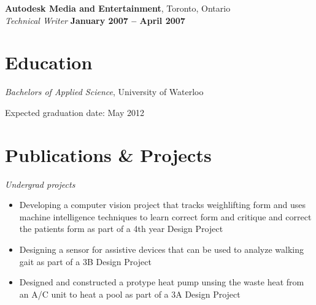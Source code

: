 \documentclass[margin,line]{resume}
\begin{document}
\begin{resume}
\begin{samepage}
    \textbf{Autodesk Media and Entertainment}, Toronto, Ontario \vspace{2mm}\\\vspace{1mm}%
    \textsl{Technical Writer} \hfill \textbf{January 2007 -- April 2007}\\
\end{samepage}

    \section{\mysidestyle Education}


    \textsl{Bachelors of Applied Science}, University of Waterloo \hfill \vspace{-3mm}\\\vspace{-1mm}%
    \begin{list2}
        \item Expected graduation date: May 2012
    \end{list2}\vspace{-1.5mm}


 	


    \section{\mysidestyle Publications \& Projects}

\textsl{Undergrad projects}
    \begin{itemize}
        \item Developing a computer vision project that tracks weighlifting form and uses machine intelligence techniques to learn correct form and critique and correct the patients form as part of a 4th year Design Project
        \item Designing a sensor for assistive devices that can be used to analyze walking gait as part of a 3B Design Project

	\item Designed and constructed a protype heat pump unsing the waste heat from an A/C unit to heat a pool as part of a 3A Design Project
    \end{itemize}


\end{resume}
\end{document}
